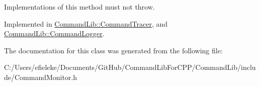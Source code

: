 Implementations of this method must not throw. 

Implemented in \mbox{\hyperlink{class_command_lib_1_1_command_tracer_a8bf102840bfad1186d0a693590afd9f9}{Command\+Lib\+::\+Command\+Tracer}}, and \mbox{\hyperlink{class_command_lib_1_1_command_logger_af0094fb705c199e54cf81f3d0accdbf3}{Command\+Lib\+::\+Command\+Logger}}.



The documentation for this class was generated from the following file\+:\begin{DoxyCompactItemize}
\item 
C\+:/\+Users/efieleke/\+Documents/\+Git\+Hub/\+Command\+Lib\+For\+C\+P\+P/\+Command\+Lib/include/Command\+Monitor.\+h\end{DoxyCompactItemize}
